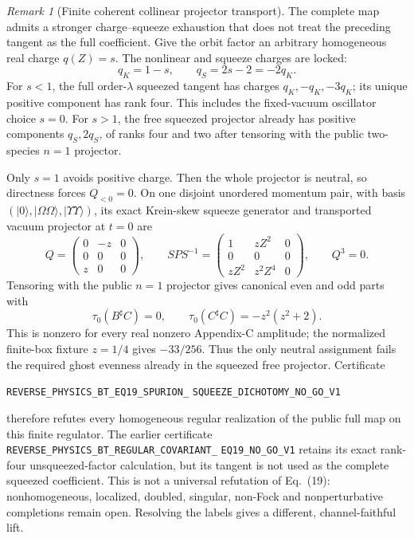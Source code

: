 \documentclass[11pt]{article}
\theoremstyle{definition}
\theoremstyle{remark}
\newtheorem{remark}[theorem]{Remark}
\begin{document}
\begin{remark}[Finite coherent collinear projector transport]
The complete map admits a stronger charge--squeeze exhaustion that does not
treat the preceding tangent as the full coefficient.  Give the orbit factor
an arbitrary homogeneous real charge $q(Z)=s$.  The nonlinear and squeeze
charges are locked:
\[
 q_K=1-s,\qquad q_S=2s-2=-2q_K.
\]
For $s<1$, the full order-$\lambda$ squeezed tangent has charges
$q_K,-q_K,-3q_K$; its unique positive component has rank four.  This includes
the fixed-vacuum oscillator choice $s=0$.  For $s>1$, the free squeezed
projector already has positive components $q_S,2q_S$, of ranks four and two
after tensoring with the public two-species $n=1$ projector.

Only $s=1$ avoids positive charge.  Then the whole projector is neutral, so
directness forces $Q_{<0}=0$.  On one disjoint unordered momentum pair, with
basis $(|0\rangle,|\Omega\Omega\rangle,|\Upsilon\Upsilon\rangle)$, its exact
Krein-skew squeeze generator and transported vacuum projector at $t=0$ are
\[
 Q=\begin{pmatrix}0&-z&0\\0&0&0\\z&0&0\end{pmatrix},\qquad
 SPS^{-1}=\begin{pmatrix}
 1&zZ^2&0\\0&0&0\\zZ^2&z^2Z^4&0
 \end{pmatrix},\qquad Q^3=0.
\]
Tensoring with the public $n=1$ projector gives canonical even and odd parts
with
\[
 \tau_0(B^\sharp C)=0,\qquad
 \tau_0(C^\sharp C)=-z^2(z^2+2).
\]
This is nonzero for every real nonzero Appendix-C amplitude; the normalized
finite-box fixture $z=1/4$ gives $-33/256$.  Thus the only neutral assignment
fails the required ghost evenness already in the squeezed free projector.
Certificate
\par\noindent
\texttt{REVERSE\_PHYSICS\_BT\_EQ19\_SPURION\_}
\allowbreak\texttt{SQUEEZE\_DICHOTOMY\_NO\_GO\_V1}
\par\noindent
therefore refutes every homogeneous regular realization of the public full
map on this finite regulator.  The earlier certificate
\texttt{REVERSE\_PHYSICS\_BT\_REGULAR\_COVARIANT\_}
\allowbreak\texttt{EQ19\_NO\_GO\_V1} retains its exact rank-four
unsqueezed-factor calculation, but its tangent is not used as the complete
squeezed coefficient.  This is not a universal refutation of Eq.~(19):
nonhomogeneous, localized, doubled, singular, non-Fock and nonperturbative
completions remain open.
Resolving the labels gives a different, channel-faithful lift.

\end{remark}
\end{document}
